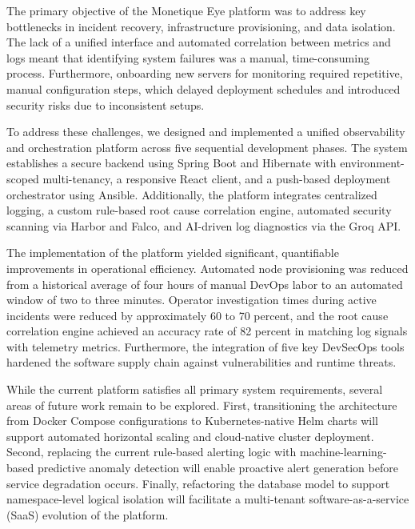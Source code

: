 \documentclass[12pt,a4paper]{report}
\begin{document}
The primary objective of the Monetique Eye platform was to address key bottlenecks in incident recovery, infrastructure provisioning, and data isolation. The lack of a unified interface and automated correlation between metrics and logs meant that identifying system failures was a manual, time-consuming process. Furthermore, onboarding new servers for monitoring required repetitive, manual configuration steps, which delayed deployment schedules and introduced security risks due to inconsistent setups.

To address these challenges, we designed and implemented a unified observability and orchestration platform across five sequential development phases. The system establishes a secure backend using Spring Boot and Hibernate with environment-scoped multi-tenancy, a responsive React client, and a push-based deployment orchestrator using Ansible. Additionally, the platform integrates centralized logging, a custom rule-based root cause correlation engine, automated security scanning via Harbor and Falco, and AI-driven log diagnostics via the Groq API.

The implementation of the platform yielded significant, quantifiable improvements in operational efficiency. Automated node provisioning was reduced from a historical average of four hours of manual DevOps labor to an automated window of two to three minutes. Operator investigation times during active incidents were reduced by approximately 60 to 70 percent, and the root cause correlation engine achieved an accuracy rate of 82 percent in matching log signals with telemetry metrics. Furthermore, the integration of five key DevSecOps tools hardened the software supply chain against vulnerabilities and runtime threats.

While the current platform satisfies all primary system requirements, several areas of future work remain to be explored. First, transitioning the architecture from Docker Compose configurations to Kubernetes-native Helm charts will support automated horizontal scaling and cloud-native cluster deployment. Second, replacing the current rule-based alerting logic with machine-learning-based predictive anomaly detection will enable proactive alert generation before service degradation occurs. Finally, refactoring the database model to support namespace-level logical isolation will facilitate a multi-tenant software-as-a-service (SaaS) evolution of the platform.

\newpage

\end{document}
